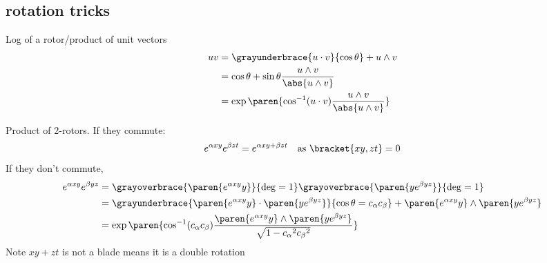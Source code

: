 \documentclass{scrartcl}
\begin{document}
\begin{multicols*}{2}
\section{rotation tricks}
Log of a rotor/product of unit vectors
\begin{align*}
  uv &= \grayunderbrace{u\cdot v}{\cos\theta} + u\wedge v  \\
     &= \cos\theta + \sin\theta \frac{u\wedge v}{\abs{u\wedge v}} \\
     &= \exp\paren{\cos^{-1}(u\cdot v) \frac{u\wedge v}{\abs{u\wedge v}}}
\end{align*}

Product of 2-rotors. If they commute:
\[
  e^{\alpha xy} e^{\beta zt} = e^{\alpha xy + \beta zt} \quad \text{as } \bracket{xy,zt} = 0
\]
If they don't commute,
\begin{align*}
  e^{\alpha xy} e^{\beta yz}
  &= \grayoverbrace{\paren{e^{\alpha xy} y}}{\deg=1}\grayoverbrace{\paren{ye^{\beta yz}}}{\deg=1} \\
  &=\grayunderbrace{\paren{e^{\alpha xy} y} \cdot \paren{ye^{\beta yz}}}{\cos \theta=c_\alpha c_\beta} + \paren{e^{\alpha xy} y} \wedge \paren{ye^{\beta yz}} \\
  &=\exp\paren{\cos^{-1}(c_\alpha c_\beta) \frac{\paren{e^{\alpha xy}y}\wedge\paren{ye^{\beta yz}}}{\sqrt{1-{c_\alpha}^2{c_\beta}^2}}}
\end{align*}
Note \(xy+zt\) is not a blade means it is a double rotation


\end{multicols*}
\end{document}
